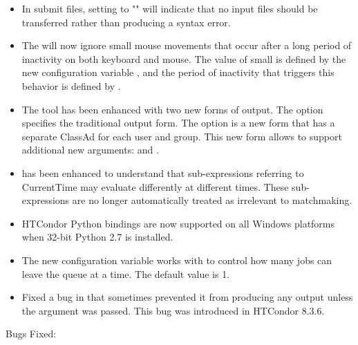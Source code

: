 \begin{itemize}
\item In submit files, setting  to "" will indicate
that no input files should be transferred rather than producing a syntax error.

\item The  will now ignore small mouse movements that occur after a long
period of inactivity on both keyboard and mouse.  The value of small is defined by the new
configuration variable , and the period of inactivity
that triggers this behavior is defined by .

\item The  tool has been enhanced
with two new forms of  output.
The  option specifies the traditional output form.
The  option is a new form that has a separate
ClassAd for each user and group.  
This new form allows  to support
additional new arguments:  and .

\item {}  has been enhanced to understand that sub-expressions referring
to CurrentTime may evaluate differently at different times. These sub-expressions are no longer
automatically treated as irrelevant to matchmaking.

\item HTCondor Python bindings are now supported on all Windows platforms when 32-bit Python 2.7 is installed.

\item The new configuration variable 
works with  to control how many jobs
can leave the queue at a time. The default value is 1.

\item Fixed a bug in  that sometimes prevented it from producing any output unless the
 argument was passed.  This bug was introduced in HTCondor 8.3.6.

\end{itemize}

\noindent Bugs Fixed:

